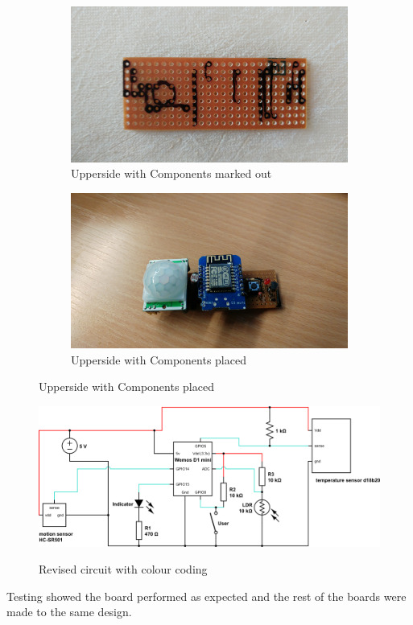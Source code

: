 \documentclass[bsc,frontabs,twoside,singlespacing,parskip,deptreport]{infthesis}
\begin{document}
\begin{figure}[ht]
\begin{subfigure}{.5\textwidth}
\includegraphics[width=.8\linewidth]{20161230_143726.jpg} 
\caption{Upperside with Components marked out }
\end{subfigure}
\begin{subfigure}{.5\textwidth}
\includegraphics[width=.8\linewidth]{20170125_181446.jpg} 
\caption{Upperside with Components placed }
\end{subfigure}
\end{figure}

\begin{figure}
\begin{center}
\centering
\label{final circuit}
\includegraphics[scale=0.6]{dissertation.png}
\caption{Revised circuit with colour coding}
\end{center}
\end{figure}
Testing showed the board performed as expected and the rest of the boards were made to the same design. 
\end{document}
